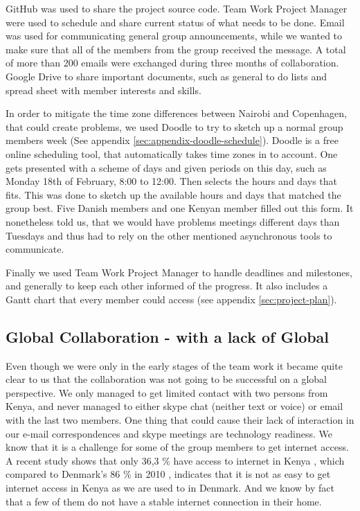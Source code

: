 GitHub was used to share the project source code. 
Team Work Project Manager were used to schedule and share current status of what needs to be done.
Email was used for communicating general group announcements, while we wanted to make sure that all of the members from the group received the message. A total of more than 200 emails were exchanged during three months of collaboration. 
Google Drive to share important documents, such as general to do lists and spread sheet with member interests and skills. 

In order to mitigate the time zone differences between Nairobi and Copenhagen, that could create problems, we used Doodle to try to sketch up a normal group members week (See appendix \ref{sec:appendix-doodle-schedule}). Doodle is a free online scheduling tool, that automatically takes time zones in to account. One gets presented with a scheme of days and given periods on this day, such as Monday 18th of February, 8:00 to 12:00. Then selects the hours and days that fits. This was done to sketch up the available hours and days that matched the group best. Five Danish members and one Kenyan member filled out this form. It nonetheless told us, that we would have problems meetings different days than Tuesdays and thus had to rely on the other mentioned asynchronous tools to communicate. 

Finally we used Team Work Project Manager to handle deadlines and milestones, and generally to keep each other informed of the progress. It also includes a Gantt chart that every member could access (see appendix \ref{sec:project-plan}).

\subsection{Global Collaboration - with a lack of Global} \label{sec:teamworkgonewrong}
Even though we were only in the early stages of the team work it became quite clear to us that the collaboration was not going to be successful on a global perspective. We only managed to get limited contact with two persons from Kenya, and never managed to either skype chat (neither text or voice) or email with the last two members. One thing that could cause their lack of interaction in our e-mail correspondences and skype meetings are technology readiness. We know that it is a challenge for some of the group members to get internet access. A recent study shows that only 36,3 \% have access to internet in Kenya \cite{capitalfm2012internet}, which compared to Denmark's 86 \% in 2010 \cite{folketingets-eu-oplysning}, indicates that it is not as easy to get internet access in Kenya as we are used to in Denmark. And we know by fact that a few of them do not have a stable internet connection in their home. 

